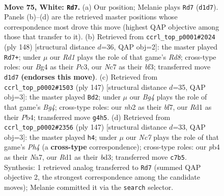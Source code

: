 \documentclass[11pt]{article}
\begin{document}
\clearpage

\begin{figure}[p]\centering
\begin{subfigure}{0.46\textwidth}\centering
\resizebox{\linewidth}{!}{%
\newchessgame
\chessboard[
  setfen={8/PbN5/5k2/8/1p3PB1/6P1/1n2K2P/3R4 w - - 18 75},
  showmover=false,
  pgfstyle=straightmove, color=movearrow, markmove={d1-d7}
]}
\caption{}
\end{subfigure}\hfill
\begin{subfigure}{0.46\textwidth}\centering
\resizebox{\linewidth}{!}{%
\newchessgame
\chessboard[
  setfen={3R4/k7/8/pP4r1/2K4p/2P2b1B/8/8 w - - 2 75},
  showmover=false,
  pgfstyle=straightmove, color=movearrow, markmove={d8-d7}
]}
\caption{}
\end{subfigure}
\\[4pt]
\begin{subfigure}{0.46\textwidth}\centering
\resizebox{\linewidth}{!}{%
\newchessgame
\chessboard[
  setfen={8/2B2B2/7k/5pbp/1p6/5K1P/8/8 b - - 18 74},
  showmover=false,
  pgfstyle=straightmove, color=movearrow, markmove={g5-d2}
]}
\caption{}
\end{subfigure}\hfill
\begin{subfigure}{0.46\textwidth}\centering
\resizebox{\linewidth}{!}{%
\newchessgame
\chessboard[
  setfen={8/np3k2/4bp2/P6p/5K2/3B1P2/1B6/8 b - - 5 74},
  showmover=false,
  pgfstyle=straightmove, color=movearrow, markmove={h5-h4}
]}
\caption{}
\end{subfigure}
\caption{\textbf{Move 75, White: \texttt{Rd7}.} (a) Our position; Melanie plays \texttt{Rd7} (\texttt{d1d7}). Panels (b)--(d) are the retrieved master positions whose correspondence most drove this move (highest QAP objective among those that transfer to it). (b) Retrieved from \texttt{ccrl\_top\_p0001\#2024} (ply 148) [structural distance $d$=36, QAP obj=2]: the master played \texttt{Rd7+}; under $\mu$ our \emph{Rd1} plays the role of that game's \emph{Rd8}; cross-type roles: our \emph{B}g4 as their \emph{P}c3, our \emph{N}c7 as their \emph{b}f3; transferred move \texttt{d1d7} \textbf{(endorses this move)}. (c) Retrieved from \texttt{ccrl\_top\_p0002\#1503} (ply 147) [structural distance $d$=35, QAP obj=3]: the master played \texttt{Bd2}; under $\mu$ our \emph{Bg4} plays the role of that game's \emph{Bg4}; cross-type roles: our \emph{n}b2 as their \emph{b}f7, our \emph{R}d1 as their \emph{P}b4; transferred move \texttt{g4h5}. (d) Retrieved from \texttt{ccrl\_top\_p0002\#2356} (ply 147) [structural distance $d$=33, QAP obj=3]: the master played \texttt{h4}; under $\mu$ our \emph{Nc7} plays the role of that game's \emph{Ph4} (a \textbf{cross-type} correspondence); cross-type roles: our \emph{p}b4 as their \emph{N}a7, our \emph{R}d1 as their \emph{b}d3; transferred move \texttt{c7b5}. Synthesis: 1 retrieved analog transferred to \texttt{Rd7} (summed QAP objective 2, the strongest correspondence among the candidate moves); Melanie committed it via the \texttt{search} selector.}
\label{fig:thought-m148}
\end{figure}
\end{document}
